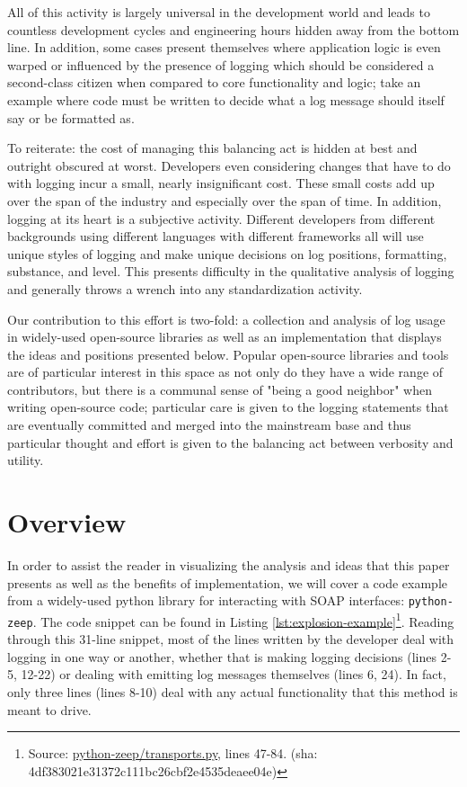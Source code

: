 \documentclass[acmsmall,review,authorversion]{acmart}
\begin{document}
    All of this activity is largely universal in the development world and leads to countless development cycles and engineering hours hidden away from the bottom line. In addition, some cases present themselves where application logic is even warped or influenced by the presence of logging which should be considered a second-class citizen when compared to core functionality and logic; take an example where code must be written to decide what a log message should itself say or be formatted as.

    To reiterate: the cost of managing this balancing act is hidden at best and outright obscured at worst. Developers even considering changes that have to do with logging incur a small, nearly insignificant cost. These small costs add up over the span of the industry and especially over the span of time. In addition, logging at its heart is a subjective activity. Different developers from different backgrounds using different languages with different frameworks all will use unique styles of logging and make unique decisions on log positions, formatting, substance, and level. This presents difficulty in the qualitative analysis of logging and generally throws a wrench into any standardization activity.

    Our contribution to this effort is two-fold: a collection and analysis of log usage in widely-used open-source libraries as well as an implementation that displays the ideas and positions presented below. Popular open-source libraries and tools are of particular interest in this space as not only do they have a wide range of contributors, but there is a communal sense of "being a good neighbor" when writing open-source code; particular care is given to the logging statements that are eventually committed and merged into the mainstream base and thus particular thought and effort is given to the balancing act between verbosity and utility.

\section{Overview}

    In order to assist the reader in visualizing the analysis and ideas that this paper presents as well as the benefits of implementation, we will cover a code example from a widely-used python library for interacting with SOAP interfaces: \lstinline{python-zeep}. The code snippet can be found in Listing \ref{lst:explosion-example}\footnote{Source: \href{https://github.com/mvantellingen/python-zeep/blob/4df383021e31372c111bc26cbf2e4535deaee04e/src/zeep/transports.py\#L47}{python-zeep/transports.py}, lines 47-84. (sha: 4df383021e31372c111bc26cbf2e4535deaee04e)}. Reading through this 31-line snippet, most of the lines written by the developer deal with logging in one way or another, whether that is making logging decisions (lines 2-5, 12-22) or dealing with emitting log messages themselves (lines 6, 24). In fact, only three lines (lines 8-10) deal with any actual functionality that this method is meant to drive.
\end{document}
